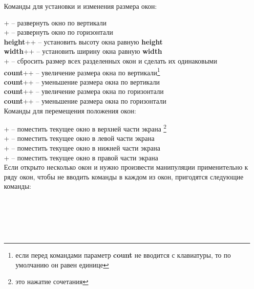 Команды для установки и изменения размера окон:

\noindent
{}+\keys{\_} -- развернуть окно по вертикали\\
+\keys{|} -- развернуть окно по горизонтали\\
\textbf{height}++\keys{\_} -- установить высоту окна равную \textbf{height}\\
\textbf{width}++\keys{|} -- установить ширину окна равную \textbf{width}\\
+\keys{=} -- сбросить размер всех разделенных окон и сделать их одинаковыми\\

\noindent
\textbf{count}++\keys{+} -- увеличение размера окна по вертикали\footnote{если перед командами параметр \textbf{count} не вводится с клавиатуры, то по умолчанию он равен единице}\\
\textbf{count}++\keys{-} -- уменьшение размера окна по вертикали\\
\textbf{count}++\keys{>} -- увеличение размера окна по горизонтали\\
\textbf{count}++\keys{<} -- уменьшение размера окна по горизонтали\\


Команды для перемещения положения окон:

\noindent
{}+ -- поместить текущее окно в верхней части экрана \footnote{ это нажатие сочетания }\\
+ -- поместить текущее окно в левой части экрана\\
+ -- поместить текущее окно в нижней части экрана\\
+ -- поместить текущее окно в правой части экрана\\

Если открыто несколько окон и нужно произвести манипуляции применительно к ряду окон, чтобы не вводить команды в каждом из окон, пригодятся следующие команды:

\noindent
{}\\
\\
\\
\\

